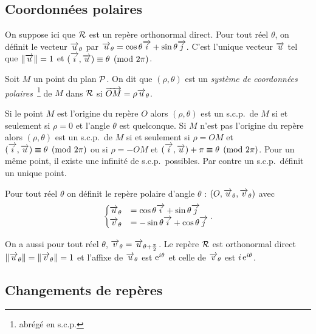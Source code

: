 \subsection{Coordonnées polaires}
\label{subsec:coordpol}
  On suppose ici que $\Rep$ est un repère orthonormal direct. Pour tout réel $\theta$, on définit le vecteur $\vu_\theta$ par $\vu_\theta=\cos\theta\vi+\sin\theta\vj$. C'est l'unique vecteur $\vu$ tel que $\norme{\vu}=1$ et $\congru{(\vi,\vu)}{\theta}{2\pi}$.
\begin{defdef}
  Soit $M$ un point du plan $\P$. On dit que $(\rho,\theta)$ est un \emph{système de coordonnées polaires}~\footnote{abrégé en s.c.p.} de $M$ dans $\Rep$ si $\vect{OM}=\rho\vu_\theta$.
\end{defdef}
%
Si le point $M$ est l'origine du repère $O$ alors $(\rho,\theta)$ est un s.c.p.\ de $M$ si et seulement si $\rho=0$ et l'angle $\theta$ est quelconque. Si $M$ n'est pas l'origine du repère alors $(\rho,\theta)$ est un s.c.p.\ de $M$ si et seulement si $\rho=OM$ et $\congru{(\vi,\vu)}{\theta}{2\pi}$ ou si $\rho=-OM$ et $\congru{(\vi,\vu)+\pi}{\theta}{2\pi}$. Pour un même point, il existe une infinité de s.c.p.\ possibles. Par contre un s.c.p.\ définit un unique point.
% 
\begin{defdef}
  Pour tout réel $\theta$ on définit le repère polaire d'angle $\theta$ : $(O, \vu_\theta, \vv_\theta)$ avec 
  \begin{equation}
    \begin{cases} 
      \vu_\theta&=\cos \theta \vi + \sin \theta \vj \\ 
      \vv_\theta&=-\sin \theta \vi + \cos \theta \vj
    \end{cases}.
  \end{equation}
\end{defdef}

On a aussi pour tout réel $\theta$, $\vv_\theta=\vu_{\theta+\frac{\pi}{2}}$. Le repère $\Rep$ est orthonormal direct $\norme{\vu_\theta}=\norme{\vv_\theta}=1$ et l'affixe de $\vu_\theta$ est $\e^{i \theta}$ et celle de $\vv_\theta$ est $i \e^{i \theta}$. %
%
\subsection{Changements de repères}
\label{subsec:changementsderepere}
